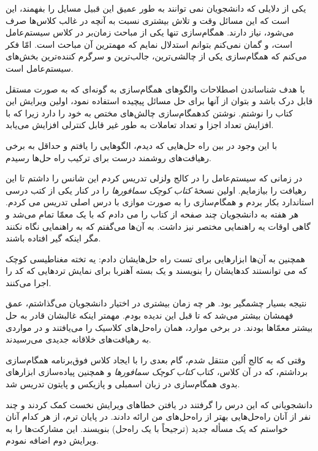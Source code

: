\documentclass{book}
\begin{document}
یکی از دلایلی که دانشجویان نمی توانند به طور عمیق این قبیل مسایل را بفهمند، این است که این مسائل وقت و تلاش بیشتری نسبت به 
آنچه در غالب کلاس‌ها صرف می‌شود، نیاز دارند. 
همگام‌سازی تنها یکی از مباحث زمان‌بر در کلاس سیستم‌عامل  است،
و گمان نمی‌کنم بتوانم استدلال نمایم که مهمترین آن مباحث است. 
امّا فکر می‌کنم که همگام‌سازی یکی از چالشی‌ترین، جالب‌ترین و سرگرم‌ کننده‌ترین بخش‌های سیستم‌عامل است.

با هدف شناساندن  اصطلاحات والگوهای همگام‌سازی به گونه‌ای که به صورت مستقل قابل درک باشد و بتوان از آنها برای حل مسائل پیچیده استفاده نمود، 
اولین ویرایش این کتاب را نوشتم.
نوشتن کدهمگام‌سازی چالش‌های مختص به خود را دارد زیرا که با افزایش تعداد اجزا و تعداد تعاملات به طور غیر قابل کنترلی افزایش می‌‌یابد.

با این وجود در بین راه حل‌هایی که دیدم، الگوهایی را یافتم و حداقل به برخی رهیافت‌های روشمند درست برای ترکیب راه حل‌ها رسیدم.

در زمانی که سیستم‌عامل را در کالج ولزلی تدریس کردم این شانس را داشتم تا این رهیافت را بیازمایم. 
اولین نسخهٔ \emph{کتاب کوچک سمافورها} را در کنار یکی از کتب درسی استاندارد بکار بردم و همگام‌سازی را به صورت موازی با درس اصلی تدریس می کردم.
هر هفته به دانشجویان چند صفحه از کتاب را می دادم که با یک معمّا تمام می‌شد و گاهی اوقات یه راهنمایی مختصر نیز داشت. 
به آن‌ها می‌گفتم که به راهنمایی نگاه نکنند مگر اینکه گیر افتاده باشند.

همچنین به آن‌ها ابزارهایی برای تست راه حل‌هایشان دادم: 
یه تخته مغناطیسی کوچک که می توانستند کدهایشان را بنویسند و یک بسته آهنربا برای نمایش تردهایی که کد را اجرا می‌کنند.

نتیجه بسیار چشمگیر بود. 
هر چه زمان بیشتری در اختیار دانشجویان می‌گذاشتم، عمق فهمشان بیشتر می‌شد که تا قبل این ندیده بودم. 
    مهمتر اینکه غالبشان قادر به حل بیشتر معمّاها بودند.
    در برخی موارد،‌ همان راه‌حل‌های کلاسیک را می‌یافتند و در مواردی به رهیافت‌های خلاقانه جدیدی می‌رسیدند. 
    
وقتی که به کالج اُلین منتقل شدم،‌ 
گام بعدی را با ایجاد کلاس فوق‌برنامه همگام‌سازی برداشتم، که در آن کلاس، کتاب \emph{کتاب کوچک سمافورها}  
و همچنین پیاده‌سازی ابزارهای بدوی همگام‌سازی در زبان اسمبلی  و پازیکس و پایتون تدریس شد.

دانشجویانی که این درس را گرفتند در یافتن خطاهای ویرایش نخست کمک کردند و چند نفر از آنان راه‌حل‌هایی بهتر از راه‌حل‌های من ارائه دادند. 
در پایان ترم، از هر کدام آنان خواستم که یک مسأله جدید (ترجیحاً با یک راه‌حل) بنویسند. این مشارکت‌ها را به ویرایش دوم اضافه نمودم. 
\end{document}
